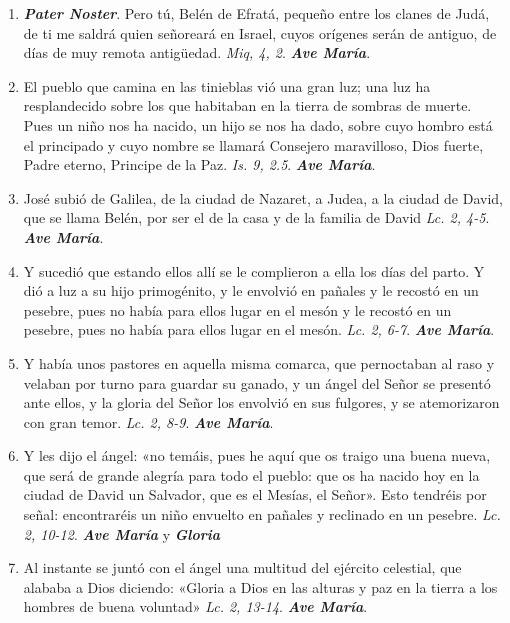 \documentclass[../../devocionario.tex]{subfiles}
\begin{document}
    \begin{enumerate}
        \item \textbf{\textit{Pater Noster}}. Pero tú, Belén de Efratá, pequeño entre los clanes de Judá, de ti me saldrá quien señoreará en Israel, cuyos
            orígenes serán de antiguo, de días de muy remota antigüedad. \textit{Miq, 4, 2}. \textbf{\textit{Ave María}}.

        \item El pueblo que camina en las tinieblas vió una gran luz; una luz ha resplandecido sobre los que habitaban en la tierra de sombras de muerte.
            Pues un niño nos ha nacido, un hijo se nos ha dado, sobre cuyo hombro está el principado y cuyo nombre se llamará Consejero maravilloso, 
            Dios fuerte, Padre eterno, Principe de la Paz. \textit{Is. 9, 2.5}. \textbf{\textit{Ave María}}.

        \item José subió de Galilea, de la ciudad de Nazaret, a Judea, a la ciudad de David, que se llama Belén, por ser el de la casa y de la familia de David 
            \textit{Lc. 2, 4-5}. \textbf{\textit{Ave María}}.

        \item Y sucedió que estando ellos allí se le complieron a ella los días del parto. Y dió a luz a su hijo primogénito, 
            y le envolvió en pañales y le recostó en un pesebre, pues no había para ellos lugar en el mesón y le recostó en un pesebre, 
            pues no había para ellos lugar en el mesón. \textit{Lc. 2, 6-7}. \textbf{\textit{Ave María}}.

        \item Y había unos pastores en aquella misma comarca, que pernoctaban al raso y velaban por turno para guardar su ganado, 
            y un ángel del Señor se presentó ante ellos, y la gloria del Señor los envolvió en sus fulgores, y se atemorizaron con gran temor. 
            \textit{Lc. 2, 8-9}. \textbf{\textit{Ave María}}.

        \item Y les dijo el ángel: «no temáis, pues he aquí que os traigo una buena nueva, que será de grande alegría para todo el pueblo: 
            que os ha nacido hoy en la ciudad de David un Salvador, que es el Mesías, el Señor». Esto tendréis por señal: encontraréis un 
            niño envuelto en pañales y reclinado en un pesebre. \textit{Lc. 2, 10-12}. \textbf{\textit{Ave María}} y \textbf{\textit{Gloria}}
        
        \item Al instante se juntó con el ángel una multitud del ejército celestial, que alababa a Dios diciendo: «Gloria a Dios en las alturas y paz en
            la tierra a los hombres de buena voluntad» \textit{Lc. 2, 13-14}. \textbf{\textit{Ave María}}.


\end{enumerate}
\end{document}
